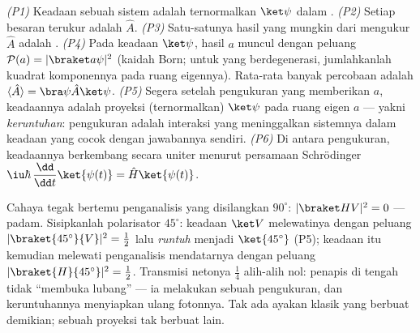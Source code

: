 \begin{theorem}\label{thm:b3:quantum-formalism:postulates}
\emph{(P1)} Keadaan sebuah sistem adalah  ternormalkan $\ket\psi$
dalam .
\emph{(P2)} Setiap besaran terukur adalah 
$\hat A$.
\emph{(P3)} Satu-satunya hasil yang mungkin dari mengukur $\hat A$
adalah .
\emph{(P4)} Pada keadaan $\ket\psi$, hasil $a$ muncul dengan peluang
$\mathcal P(a) = |\braket a\psi|^2$ (kaidah Born; untuk  yang
berdegenerasi, jumlahkanlah kuadrat komponennya pada ruang eigennya).
Rata-rata banyak percobaan adalah $\langle\hat A\rangle =
\bra\psi\hat A\ket\psi$.
\emph{(P5)} Segera setelah pengukuran yang memberikan $a$, keadaannya
adalah proyeksi (ternormalkan) $\ket\psi$ pada ruang eigen $a$ ---
yakni \emph{keruntuhan}: pengukuran adalah interaksi yang meninggalkan
sistemnya dalam keadaan yang cocok dengan jawabannya sendiri.
\emph{(P6)} Di antara pengukuran, keadaannya berkembang secara uniter
menurut persamaan Schrödinger
$\iu\hbar\,\dfrac{\dd}{\dd t}\ket{\psi(t)} = \hat H\ket{\psi(t)}$.
\end{theorem}
\admitted

\begin{example}\label{ex:b3:quantum-formalism:threepolarizers}
Cahaya tegak bertemu penganalisis yang disilangkan $90^\circ$: $|\braket
HV|^2 = 0$ --- padam. Sisipkanlah polarisator $45^\circ$: keadaan
$\ket V$ melewatinya dengan peluang $|\braket{45^\circ}{V}|^2 =
\tfrac12$ lalu \emph{runtuh} menjadi $\ket{45^\circ}$ (P5); keadaan itu
kemudian melewati penganalisis mendatarnya dengan peluang
$|\braket{H}{45^\circ}|^2 = \tfrac12$. Transmisi netonya $\tfrac14$
alih-alih nol: penapis di tengah tidak ``membuka lubang'' --- ia
melakukan sebuah pengukuran, dan keruntuhannya menyiapkan ulang fotonnya.
Tak ada ayakan klasik yang berbuat demikian; sebuah proyeksi tak berbuat
lain.
\end{example}


